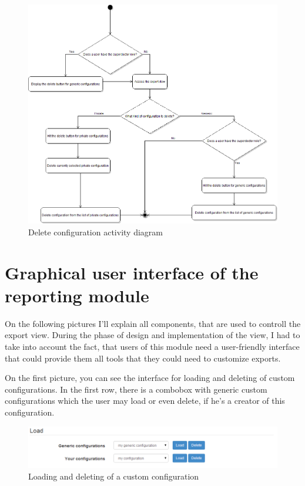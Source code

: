 \documentclass[thesis=B,english]{FITthesis}[2012/10/20]
\begin{document}
\begin{figure}[ht]\centering
\includegraphics[width=0.8\paperwidth]{deleteConfigurationDiagram}
		\caption{Delete configuration activity diagram}
\end{figure}



\section{Graphical user interface of the reporting module}
On the following pictures I'll explain all components, that are used to controll the export view. During the phase of design and implementation of the view, I had to take into account the fact, that users of this module need a user-friendly interface that could provide them all tools that they could need to customize exports.

On the first picture, you can see the interface for loading and deleting of custom configurations. In the first row, there is a combobox with generic custom configurations which the user may load or even delete, if he's a creator of this configuration.

\begin{figure}[ht]\centering
\includegraphics[width=0.8\paperwidth]{load}
		\caption{Loading and deleting of a custom configuration}
\end{figure}
\end{document}
